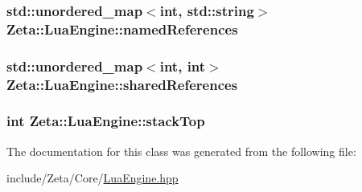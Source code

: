 \hypertarget{classZeta_1_1LuaEngine_ab5b777346b1ce3fbb8848d72eb3657ad}{
\subsubsection[{named\+References}]{\setlength{\rightskip}{0pt plus 5cm}std\+::unordered\+\_\+map$<$int, std\+::string$>$ Zeta\+::\+Lua\+Engine\+::named\+References\hspace{0.3cm}{\ttfamily [private]}}}\label{classZeta_1_1LuaEngine_ab5b777346b1ce3fbb8848d72eb3657ad}
\hypertarget{classZeta_1_1LuaEngine_a6ae178c96d635fedd5de66fca06af4b2}{
\subsubsection[{shared\+References}]{\setlength{\rightskip}{0pt plus 5cm}std\+::unordered\+\_\+map$<$int, int$>$ Zeta\+::\+Lua\+Engine\+::shared\+References\hspace{0.3cm}{\ttfamily [private]}}}\label{classZeta_1_1LuaEngine_a6ae178c96d635fedd5de66fca06af4b2}
\hypertarget{classZeta_1_1LuaEngine_a7d5faf4154dcd428f46435070bb6972f}{
\subsubsection[{stack\+Top}]{\setlength{\rightskip}{0pt plus 5cm}int Zeta\+::\+Lua\+Engine\+::stack\+Top\hspace{0.3cm}{\ttfamily [private]}}}\label{classZeta_1_1LuaEngine_a7d5faf4154dcd428f46435070bb6972f}


The documentation for this class was generated from the following file\+:\begin{DoxyCompactItemize}
\item 
include/\+Zeta/\+Core/\hyperlink{LuaEngine_8hpp}{Lua\+Engine.\+hpp}\end{DoxyCompactItemize}
